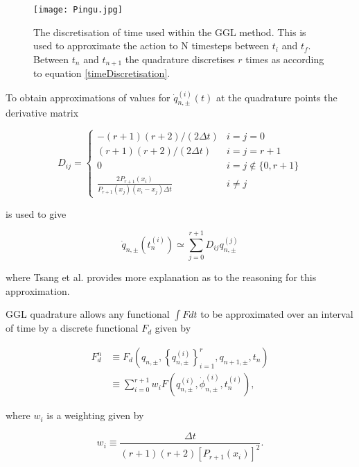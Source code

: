 \documentclass[10pt]{iopart}
\begin{document}
\begin{figure}
	\centering
	\label{GGLDiscretisation}
	\texttt{[image: Pingu.jpg]}
	\caption{The discretisation of time used within the GGL method. This is used to approximate the action to N timesteps between $t_i$ and $t_f$. Between $t_n$ and $t_{n+1}$ the quadrature discretises $r$ times as according to equation \ref{timeDiscretisation}.}
\end{figure}

To obtain approximations of values for $\dot{q}_{n,\pm}^{(i)}(t)$ at the quadrature points the derivative matrix \cite{Boyd}

\begin{equation}
	D_{ij} = 
	\begin{cases}
		-(r+1)(r+2)/(2\Delta t) &i=j=0 \\
		(r+1)(r+2)/(2\Delta t) &i=j=r+1 \\
		0 &i=j\notin\{0,r+1\} \\
		\frac{2P_{r+1}(x_i)}{P_{r+1}(x_j)(x_i-x_j)\Delta t} &i\neq j
	\end{cases}
\end{equation}
	
is used to give

\begin{equation}
	\dot{q}_{n,\pm}(t_n^{(i)}) \simeq \sum_{j=0}^{r+1} D_{ij}q_{n,\pm}^{(j)}
\end{equation}

where Tsang et al. \cite{Tsang_Slimplectic} provides more explanation as to the reasoning for this approximation.

 GGL quadrature allows any functional $\int F dt$ to be approximated over an interval of time by a discrete functional $F_d$ given by
 
\begin{equation}
\label{discretisedFunctional}
\begin{aligned}
F_d^n &\equiv F_d\left(q_{n, \pm},\left\{q_{n, \pm}^{(i)}\right\}_{i=1}^r, q_{n+1, \pm}, t_n\right) \\  &\equiv \sum_{i=0}^{r+1} w_i F\left(q_{n, \pm}^{(i)}, \dot{\phi}_{n, \pm}^{(i)}, t_n^{(i)}\right),
\end{aligned}
\end{equation}

where $w_i$ is a weighting given by 

\begin{equation}
	w_i \equiv \frac{\Delta t}{(r+1)(r+2)[P_{r+1}(x_i)]^2}.
\end{equation}
\end{document}
